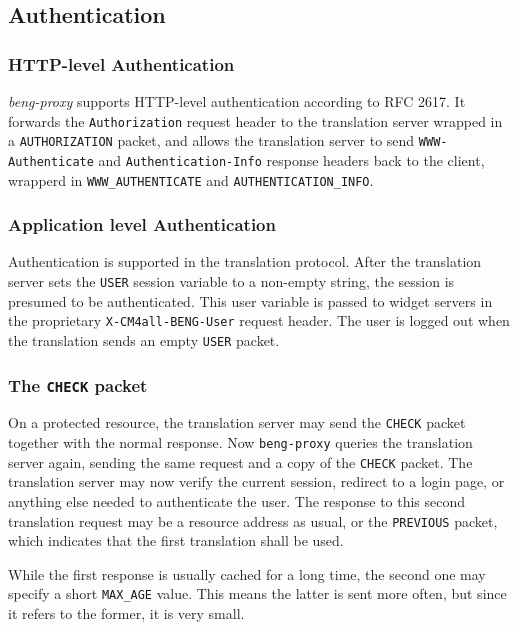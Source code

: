 \documentclass[a4paper,12pt]{article}
\begin{document}
\subsection{Authentication}
\label{authentication}

\subsubsection{HTTP-level Authentication}

\emph{beng-proxy} supports HTTP-level authentication according to RFC
2617.  It forwards the \texttt{Authorization} request header to the
translation server wrapped in a \verb|AUTHORIZATION| packet, and
allows the translation server to send \texttt{WWW-Authenticate} and
\texttt{Authentication-Info} response headers back to the client,
wrapperd in \verb|WWW_AUTHENTICATE| and \verb|AUTHENTICATION_INFO|.

\subsubsection{Application level Authentication}

Authentication is supported in the translation protocol.  After the
translation server sets the \verb|USER| session variable to a
non-empty string, the session is presumed to be authenticated.  This
user variable is passed to widget servers in the proprietary
\texttt{X-CM4all-BENG-User} request header.  The user is logged out
when the translation sends an empty \verb|USER| packet.

\subsubsection{The \texttt{CHECK} packet}

On a protected resource, the translation server may send the
\verb|CHECK| packet together with the normal response.  Now
\texttt{beng-proxy} queries the translation server again, sending the
same request and a copy of the \verb|CHECK| packet.  The translation
server may now verify the current session, redirect to a login page,
or anything else needed to authenticate the user.  The response to
this second translation request may be a resource address as usual, or
the \verb|PREVIOUS| packet, which indicates that the first
translation shall be used.

While the first response is usually cached for a long time, the second
one may specify a short \texttt{MAX\_AGE} value.  This means the latter
is sent more often, but since it refers to the former, it is very
small.
\end{document}

